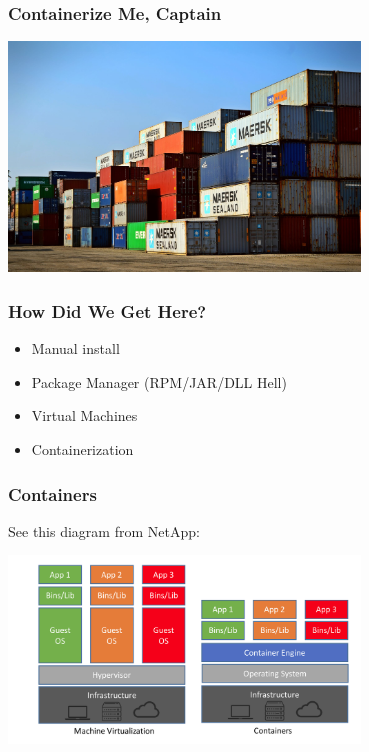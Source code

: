 \begin{frame}
\frametitle{Containerize Me, Captain}

\begin{center}
	\includegraphics[width=0.7\textwidth]{images/container.jpeg}
\end{center}

\end{frame}


\begin{frame}
\frametitle{How Did We Get Here?}

\begin{itemize}
	\item Manual install
	\item Package Manager (RPM/JAR/DLL Hell)
	\item Virtual Machines
	\item Containerization
\end{itemize}


\end{frame}


\begin{frame}
\frametitle{Containers}

See this diagram from NetApp:

\begin{center}
	\includegraphics[width=0.7\textwidth]{images/cvm.png}
\end{center}


\end{frame}




